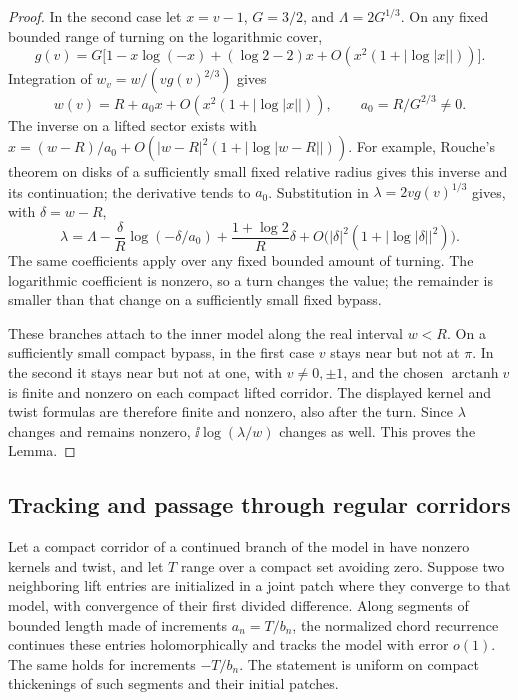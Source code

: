 \begin{proof}
In the second case let \(x=v-1\), \(G=3/2\), and
\(\Lambda=2G^{1/3}\). On any fixed bounded range of turning on the
logarithmic cover,
\[
 g(v)=G\bigl[1-x\log(-x)+(\log2-2)x
              +O(x^2(1+|\log|x||))\bigr].
\]
Integration of \(w_v=w/(vg(v)^{2/3})\) gives
\begin{equation}
 \label{profile:logarithmic-inverse}
 w(v)=R+a_0x+O(x^2(1+|\log|x||)),\qquad
 a_0=R/G^{2/3}\ne0.
\end{equation}
The inverse on a lifted sector exists with
\(x=(w-R)/a_0+O(|w-R|^2(1+|\log|w-R||))\). For example,
Rouche's theorem on disks of a sufficiently small fixed relative
radius gives this inverse and its continuation; the derivative
tends to \(a_0\). Substitution in \(\lambda=2vg(v)^{1/3}\) gives,
with \(\delta=w-R\),
\[
 \lambda=\Lambda-\frac{\delta}{R}\log(-\delta/a_0)
       +\frac{1+\log2}{R}\delta
       +O\bigl(|\delta|^2(1+|\log|\delta||^2)\bigr).
\]
The same coefficients apply over any fixed bounded amount of turning.
The logarithmic coefficient is nonzero, so a turn changes the value;
the remainder is smaller than that change on a sufficiently small
fixed bypass.

These branches attach to the inner model along the real interval
\(w<R\). On a sufficiently small compact bypass, in the first case
\(v\) stays near but not at \(\pi\). In the second it stays near
but not at one, with \(v\ne0,\pm1\), and the chosen
\(\operatorname{arctanh}v\) is finite and nonzero on each compact
lifted corridor. The displayed kernel and twist formulas are
therefore finite and nonzero, also after the turn. Since \(\lambda\)
changes and remains nonzero, \(\ii\log(\lambda/w)\) changes as
well. This proves the Lemma.
\end{proof}

\subsection{Tracking and passage through regular corridors}

\begin{lemma}
\label{profile:tracking}
Let a compact corridor of a continued branch of the model in
 have nonzero kernels and twist, and let
\(T\) range over a compact set avoiding zero. Suppose two neighboring
lift entries are initialized in a joint patch where they converge to
that model, with convergence of their first divided difference.
Along segments of bounded length made of increments
\(a_n=T/b_n\), the normalized chord recurrence continues these
entries holomorphically and tracks the model with error \(o(1)\).
The same holds for increments \(-T/b_n\). The statement is uniform
on compact thickenings of such segments and their initial patches.
\end{lemma}

